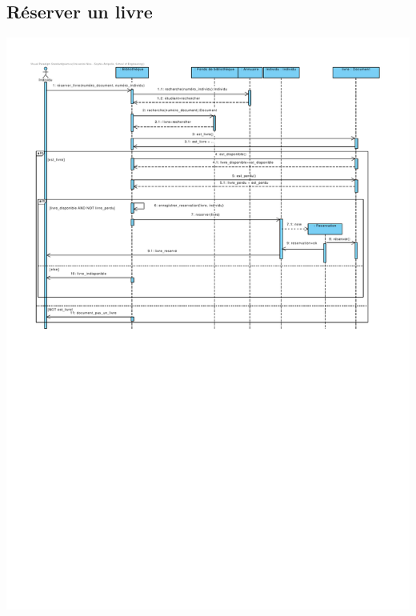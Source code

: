 \documentclass{article}
\begin{document}
\subsection{Réserver un livre}
\vspace{-5em}
\hspace*{-10em}\includegraphics[scale=1.56]{sequence_reserver_un_livre}
\vspace*{-4em}
\end{document}
